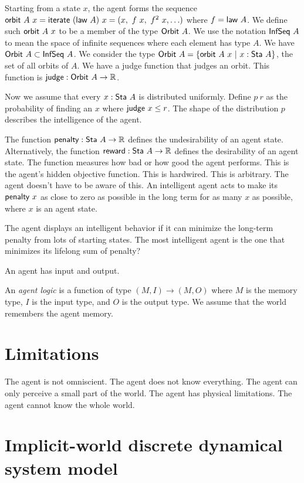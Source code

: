 Starting from a state \(x\), the agent forms the sequence
\( \textsf{orbit}~A~x = \textsf{iterate}~(\textsf{law}~A)~x = (x, ~ f~x, ~ f^2~x, \ldots) \) where \(f = \textsf{law}~A\).
We define such \(\textsf{orbit}~A~x\) to be a member of the type \(\textsf{Orbit}~A\).
We use the notation \(\textsf{InfSeq}~A\) to mean
the space of infinite sequences
where each element has type \(A\).
We have \(\textsf{Orbit}~A \subset \textsf{InfSeq}~A\).
We consider the type \(\textsf{Orbit}~A = \{ \textsf{orbit}~A~x ~|~ x : \textsf{Sta}~A \}\),
the set of all orbits of \(A\).
We have a judge function that judges an orbit.
This function is \(\textsf{judge} : \textsf{Orbit}~A \to \mathbb{R}\).

Now we assume that every \(x : \textsf{Sta}~A\) is distributed uniformly.
Define \(p~r\) as
the probability of finding an \(x\) where \(\textsf{judge}~x \le r\).
The shape of the distribution \(p\)
describes the intelligence of the agent.

The function \(\textsf{penalty} : \textsf{Sta}~A \to \mathbb{R}\)
defines the undesirability of an agent state.
Alternatively, the function \(\textsf{reward} : \textsf{Sta}~A \to \mathbb{R}\)
defines the desirability of an agent state.
The function measures how bad or how good the agent performs.
This is the agent's hidden objective function.
This is hardwired.
This is arbitrary.
The agent doesn't have to be aware of this.
An intelligent agent acts to make its
\(\textsf{penalty}~x\) as close to zero as possible
in the long term for as many \(x\) as possible,
where \(x\) is an agent state.

The agent displays an intelligent behavior
if it can minimize the long-term penalty from lots of starting states.
The most intelligent agent is the one that minimizes its lifelong sum of penalty?

An agent has input and output.

An \emph{agent logic} is a function of type \((M,I) \to (M,O)\)
where \(M\) is the memory type,
\(I\) is the input type,
and \(O\) is the output type.
We assume that the world remembers the agent memory.

\section{Limitations}

The agent is not omniscient.
The agent does not know everything.
The agent can only perceive a small part of the world.
The agent has physical limitations.
The agent cannot know the whole world.

\section{Implicit-world discrete dynamical system model}

